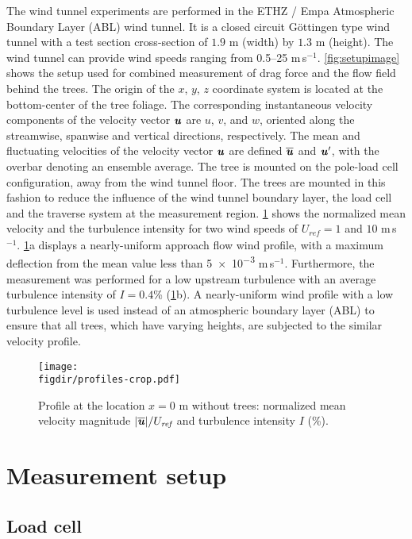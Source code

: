 The wind tunnel experiments are performed in the ETHZ / Empa Atmospheric Boundary Layer (ABL) wind tunnel. It is a closed circuit G\"ottingen type wind tunnel with a test section cross-section of $1.9$ m (width) by $1.3$ m (height). The wind tunnel can provide wind speeds ranging from \numrange{0.5}{25} m\,s$^{-1}$. \cref{fig:setupimage} shows the setup used for combined measurement of drag force and the flow field behind the trees. The origin of the $x$, $y$, $z$  coordinate system is located at the bottom-center of the tree foliage. The corresponding instantaneous velocity components of the velocity vector $\textbf{\textit{u}}$ are $u$, $v$, and $w$, oriented along the streamwise, spanwise and vertical directions, respectively. The mean and fluctuating velocities of the velocity vector $\textbf{\textit{u}}$ are defined $\overline{\textbf{\textit{u}}}$ and $\textbf{\textit{u}}'$, with the overbar denoting an ensemble average. The tree is mounted on the pole-load cell configuration, away from the wind tunnel floor. The trees are mounted in this fashion to reduce the influence of the wind tunnel boundary layer, the load cell and the traverse system at the measurement region. \cref{fig:profiles} shows the normalized mean velocity and the turbulence intensity for two wind speeds of $U_{\textit{ref}}=1$ and $10$ m\,s$^{-1}$. \cref{fig:profiles}a displays a nearly-uniform approach flow wind profile, with a maximum deflection from the mean value less than \num{5e-3} m\,s$^{-1}$. Furthermore, the measurement was performed for a low upstream turbulence with an average turbulence intensity of $I=0.4$\% (\cref{fig:profiles}b). A nearly-uniform wind profile with a low turbulence level is used instead of an atmospheric boundary layer (ABL) to ensure that all trees, which have varying heights, are subjected to the similar velocity profile.

	\begin{figure}[t]
		\centering
		\texttt{[image: \\figdir/profiles-crop.pdf]}
		\caption{Profile at the location $x=0$ m without trees:  normalized mean velocity magnitude $|\overline{\textbf{\textit{u}}}|/U_{\textit{ref}}$ and  turbulence intensity $I$ (\%).}
		\label{fig:profiles}
	\end{figure}

\section{Measurement setup}

\subsection{Load cell}
\label{subsec:loadcell}

